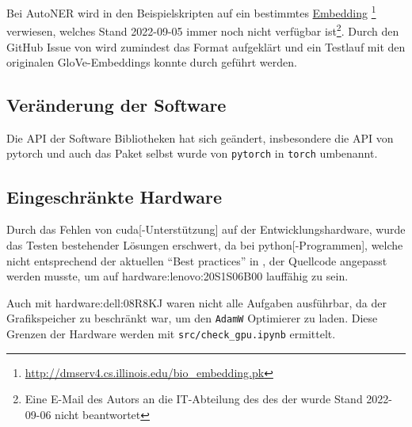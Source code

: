 Bei \gls{AutoNER}
wird in den Beispielskripten auf ein bestimmtes
\href{http://dmserv4.cs.illinois.edu/bio_embedding.pk}{Embedding} \footnote{\url{http://dmserv4.cs.illinois.edu/bio_embedding.pk}}
verwiesen,
welches Stand 2022-09-05 immer noch nicht verfügbar ist\footnote{
	Eine E-Mail des Autors an die IT-Abteilung des 
	des 
	der 
	wurde Stand 2022-09-06
	nicht beantwortet}.
Durch den GitHub Issue \autocite{shangjingbo1226:AutoNER:issues:44} von
\citeauthor{shangjingbo1226:AutoNER:issues:44}
wird zumindest das Format aufgeklärt
und ein Testlauf mit den originalen \gls{GloVe}-Embeddings konnte durch geführt werden. \autocite{pennington2014glove}


\subsection{Veränderung der Software}

Die API der Software Bibliotheken hat sich geändert,
insbesondere die API von \gls{pytorch}
und auch das Paket
selbst wurde von \texttt{pytorch} in
\texttt{torch} umbenannt.

\subsection{Eingeschränkte Hardware}
Durch das Fehlen von \gls{cuda}[-Unterstützung]
auf der Entwicklungshardware,
wurde das Testen bestehender Lösungen erschwert,
da bei \gls{python}[-Programmen],
welche nicht entsprechend der aktuellen \enquote{Best practices}
in \autocite[Device-agnostic code]{pytorch:docs:1.12:notes:cuda},
der Quellcode angepasst werden musste,
um auf \gls{hardware:lenovo:20S1S06B00} lauffähig zu sein.

Auch mit \gls{hardware:dell:08R8KJ} waren nicht alle Aufgaben ausführbar,
da der Grafikspeicher zu beschränkt war,
um den \texttt{AdamW} Optimierer zu laden.
Diese Grenzen der Hardware werden mit \texttt{src/check_gpu.ipynb}
ermittelt. \autocite{huggingface:docs:Transformers:perf_train_gpu_one}


